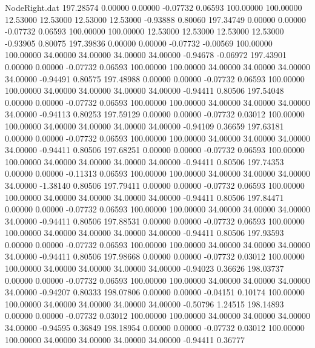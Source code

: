 \begin{filecontents}{NodeRight.dat}
 197.28574    0.00000    0.00000    -0.07732    0.06593  100.00000  100.00000   12.53000   12.53000   12.53000   12.53000   -0.93888    0.80060
 197.34749    0.00000    0.00000    -0.07732    0.06593  100.00000  100.00000   12.53000   12.53000   12.53000   12.53000   -0.93905    0.80075
 197.39836    0.00000    0.00000    -0.07732   -0.00569  100.00000  100.00000   34.00000   34.00000   34.00000   34.00000   -0.94678   -0.06972
 197.43901    0.00000    0.00000    -0.07732    0.06593  100.00000  100.00000   34.00000   34.00000   34.00000   34.00000   -0.94491    0.80575
 197.48988    0.00000    0.00000    -0.07732    0.06593  100.00000  100.00000   34.00000   34.00000   34.00000   34.00000   -0.94411    0.80506
 197.54048    0.00000    0.00000    -0.07732    0.06593  100.00000  100.00000   34.00000   34.00000   34.00000   34.00000   -0.94113    0.80253
 197.59129    0.00000    0.00000    -0.07732    0.03012  100.00000  100.00000   34.00000   34.00000   34.00000   34.00000   -0.94109    0.36659
 197.63181    0.00000    0.00000    -0.07732    0.06593  100.00000  100.00000   34.00000   34.00000   34.00000   34.00000   -0.94411    0.80506
 197.68251    0.00000    0.00000    -0.07732    0.06593  100.00000  100.00000   34.00000   34.00000   34.00000   34.00000   -0.94411    0.80506
 197.74353    0.00000    0.00000    -0.11313    0.06593  100.00000  100.00000   34.00000   34.00000   34.00000   34.00000   -1.38140    0.80506
 197.79411    0.00000    0.00000    -0.07732    0.06593  100.00000  100.00000   34.00000   34.00000   34.00000   34.00000   -0.94411    0.80506
 197.84471    0.00000    0.00000    -0.07732    0.06593  100.00000  100.00000   34.00000   34.00000   34.00000   34.00000   -0.94411    0.80506
 197.88531    0.00000    0.00000    -0.07732    0.06593  100.00000  100.00000   34.00000   34.00000   34.00000   34.00000   -0.94411    0.80506
 197.93593    0.00000    0.00000    -0.07732    0.06593  100.00000  100.00000   34.00000   34.00000   34.00000   34.00000   -0.94411    0.80506
 197.98668    0.00000    0.00000    -0.07732    0.03012  100.00000  100.00000   34.00000   34.00000   34.00000   34.00000   -0.94023    0.36626
 198.03737    0.00000    0.00000    -0.07732    0.06593  100.00000  100.00000   34.00000   34.00000   34.00000   34.00000   -0.94207    0.80333
 198.07806    0.00000    0.00000    -0.04151    0.10174  100.00000  100.00000   34.00000   34.00000   34.00000   34.00000   -0.50796    1.24515
 198.14893    0.00000    0.00000    -0.07732    0.03012  100.00000  100.00000   34.00000   34.00000   34.00000   34.00000   -0.94595    0.36849
 198.18954    0.00000    0.00000    -0.07732    0.03012  100.00000  100.00000   34.00000   34.00000   34.00000   34.00000   -0.94411    0.36777

\end{filecontents}
